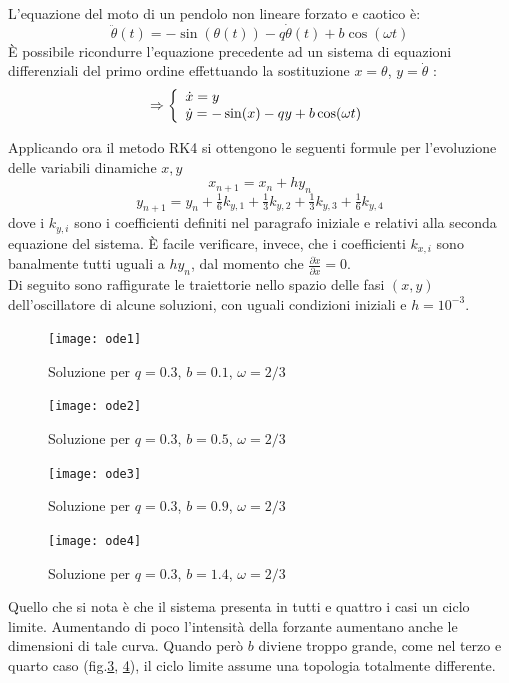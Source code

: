 L'equazione del moto di un pendolo non lineare forzato e caotico è:
$$\ddot{\theta}(t) = -\sin(\theta(t)) - q\dot{\theta}(t) + b\cos(\omega t)$$
È possibile ricondurre l'equazione precedente ad un sistema di equazioni differenziali del primo ordine effettuando la sostituzione $x=\theta$, $y=\dot{\theta}$ :
\[
  \Rightarrow \left\{
  \begin{array}{l l}
    \dot{x}=y\\
    \dot{y}=-\sin(x) - qy + b\cos(\omega t)\\
  \end{array} \right.
\]

Applicando ora il metodo RK4 si ottengono le seguenti formule per l'evoluzione delle variabili dinamiche $x,y$
$$x_{n+1}=x_n+hy_n$$
$$y_{n+1}=y_n+\tfrac16 k_{y,1}+\tfrac13 k_{y,2}+\tfrac13 k_{y,3}+\tfrac16k_{y,4}$$
dove i $k_{y,i}$ sono i coefficienti definiti nel paragrafo iniziale e relativi alla seconda equazione del sistema. È facile verificare, invece, che i coefficienti $k_{x,i}$ sono banalmente tutti uguali a $hy_n$, dal momento che $\frac{\partial\dot{x}}{\partial x}=0$.
\\

Di seguito sono raffigurate le traiettorie nello spazio delle fasi $(x,y)$ dell'oscillatore di alcune soluzioni, con uguali condizioni iniziali e $h=10^{-3}$.
\begin{figure}[H]
\centering
\texttt{[image: ode1]}
\caption{Soluzione per $q=0.3$, $b=0.1$, $\omega=2/3$}
\label{fig:ode1}
\end{figure}

\begin{figure}[H]
\centering
\texttt{[image: ode2]}
\caption{Soluzione per $q=0.3$, $b=0.5$, $\omega=2/3$}
\label{fig:ode2}
\end{figure}

\begin{figure}[H]
\centering
\texttt{[image: ode3]}
\caption{Soluzione per $q=0.3$, $b=0.9$, $\omega=2/3$}
\label{fig:ode3}
\end{figure}

\begin{figure}[H]
\centering
\texttt{[image: ode4]}
\caption{Soluzione per $q=0.3$, $b=1.4$, $\omega=2/3$}
\label{fig:ode4}
\end{figure}

Quello che si nota è che il sistema presenta in tutti e quattro i casi un ciclo limite. Aumentando di poco l'intensità della forzante aumentano anche le dimensioni di tale curva. Quando però $b$ diviene troppo grande, come nel terzo e quarto caso (fig.\ref{fig:ode3}, \ref{fig:ode4}), il ciclo limite assume una topologia totalmente differente.
